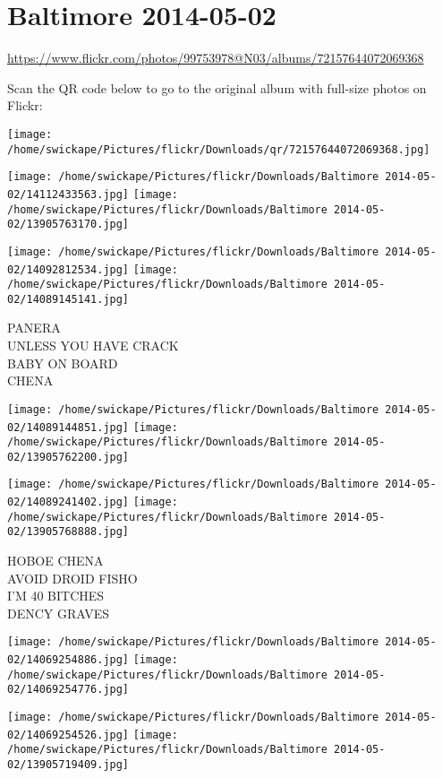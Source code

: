 \documentclass[10pt,letterpaper]{article}
\begin{document}
\section*{Baltimore 2014-05-02}

\url{https://www.flickr.com/photos/99753978@N03/albums/72157644072069368}

Scan the QR code below to go to the original album with full-size photos on Flickr:

\texttt{[image: /home/swickape/Pictures/flickr/Downloads/qr/72157644072069368.jpg]}
\pagebreak

\texttt{[image: /home/swickape/Pictures/flickr/Downloads/Baltimore 2014-05-02/14112433563.jpg]}
\texttt{[image: /home/swickape/Pictures/flickr/Downloads/Baltimore 2014-05-02/13905763170.jpg]}

\texttt{[image: /home/swickape/Pictures/flickr/Downloads/Baltimore 2014-05-02/14092812534.jpg]}
\texttt{[image: /home/swickape/Pictures/flickr/Downloads/Baltimore 2014-05-02/14089145141.jpg]}

PANERA\\
UNLESS YOU HAVE CRACK\\
BABY ON BOARD\\
CHENA
\pagebreak

\texttt{[image: /home/swickape/Pictures/flickr/Downloads/Baltimore 2014-05-02/14089144851.jpg]}
\texttt{[image: /home/swickape/Pictures/flickr/Downloads/Baltimore 2014-05-02/13905762200.jpg]}

\texttt{[image: /home/swickape/Pictures/flickr/Downloads/Baltimore 2014-05-02/14089241402.jpg]}
\texttt{[image: /home/swickape/Pictures/flickr/Downloads/Baltimore 2014-05-02/13905768888.jpg]}

HOBOE CHENA\\
AVOID DROID FISHO\\
I'M 40 BITCHES\\
DENCY GRAVES
\pagebreak

\texttt{[image: /home/swickape/Pictures/flickr/Downloads/Baltimore 2014-05-02/14069254886.jpg]}
\texttt{[image: /home/swickape/Pictures/flickr/Downloads/Baltimore 2014-05-02/14069254776.jpg]}

\texttt{[image: /home/swickape/Pictures/flickr/Downloads/Baltimore 2014-05-02/14069254526.jpg]}
\texttt{[image: /home/swickape/Pictures/flickr/Downloads/Baltimore 2014-05-02/13905719409.jpg]}
\end{document}
